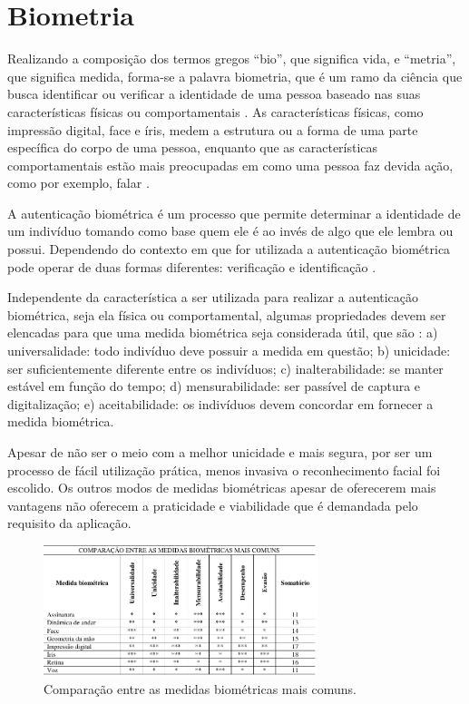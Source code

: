 \section{Biometria}\label{sec:biometria}

Realizando a composição dos termos gregos “bio”, que significa vida, e “metria”, que
significa medida, forma-se a palavra biometria, que é um ramo da ciência que busca
identificar ou verificar a identidade de uma pessoa baseado nas suas características
físicas ou comportamentais \cite{refer6}. As características físicas, como
impressão digital, face e íris, medem a estrutura ou a forma de uma parte específica do
corpo de uma pessoa, enquanto que as características comportamentais estão mais
preocupadas em como uma pessoa faz devida ação, como por exemplo, falar \cite{refer7}.

A autenticação biométrica é um processo que permite determinar a identidade de um
indivíduo tomando como base quem ele é ao invés de algo que ele lembra ou possui.
Dependendo do contexto em que for utilizada a autenticação biométrica pode operar de
duas formas diferentes: verificação e identificação \cite{refer6}.


Independente da característica a ser utilizada para realizar a autenticação
biométrica, seja ela física ou comportamental, algumas propriedades devem ser
elencadas para que uma medida biométrica seja considerada útil, que são \cite{refer8}:
a) universalidade: todo indivíduo deve possuir a medida em questão;
b) unicidade: ser suficientemente diferente entre os indivíduos;
c) inalterabilidade: se manter estável em função do tempo;
d) mensurabilidade: ser passível de captura e digitalização;
e) aceitabilidade: os indivíduos devem concordar em fornecer a medida biométrica.

Apesar de não ser o meio com a melhor unicidade e mais segura, por ser um processo de fácil utilização prática, menos invasiva o reconhecimento facial foi escolido. Os outros modos de medidas biométricas apesar de oferecerem mais vantagens não oferecem a praticidade e viabilidade que é demandada pelo requisito da aplicação.

\begin{figure}[ht]
\centering
\includegraphics[width=8cm]{images/comparacao.png}
\caption{Comparação entre as medidas biométricas mais comuns. }
\label{fig:comparacao}
\end{figure}
